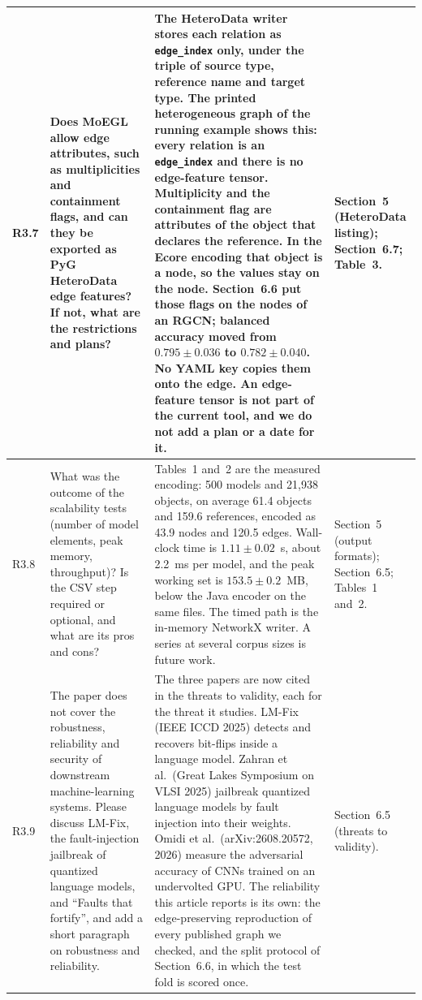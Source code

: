 \documentclass[11pt,a4paper]{article}
\begin{document}
\begin{longtable}{@{}P{1.0cm}P{4.3cm}P{5.9cm}P{3.9cm}@{}}
R3.7 &
Does MoEGL allow edge attributes, such as multiplicities and containment flags, and can they be exported as PyG HeteroData edge features? If not, what are the restrictions and plans? &
The HeteroData writer stores each relation as \texttt{edge\_index} only, under the triple of source type, reference name and target type. The printed heterogeneous graph of the running example shows this: every relation is an \texttt{edge\_index} and there is no edge-feature tensor. Multiplicity and the containment flag are attributes of the object that declares the reference. In the Ecore encoding that object is a node, so the values stay on the node. Section~6.6 put those flags on the nodes of an RGCN; balanced accuracy moved from $0.795\pm0.036$ to $0.782\pm0.040$. No YAML key copies them onto the edge. An edge-feature tensor is not part of the current tool, and we do not add a plan or a date for it. &
Section~5 (HeteroData listing); Section~6.7; Table~3. \\
\midrule

R3.8 &
What was the outcome of the scalability tests (number of model elements, peak memory, throughput)? Is the CSV step required or optional, and what are its pros and cons? &
Tables~1 and~2 are the measured encoding: 500 models and 21{,}938 objects, on average 61.4 objects and 159.6 references, encoded as 43.9 nodes and 120.5 edges. Wall-clock time is $1.11\pm0.02$~s, about 2.2~ms per model, and the peak working set is $153.5\pm0.2$~MB, below the Java encoder on the same files. The timed path is the in-memory NetworkX writer. A series at several corpus sizes is future work. &
Section~5 (output formats); Section~6.5; Tables~1 and~2. \\
\midrule

R3.9 &
The paper does not cover the robustness, reliability and security of downstream machine-learning systems. Please discuss LM-Fix, the fault-injection jailbreak of quantized language models, and ``Faults that fortify'', and add a short paragraph on robustness and reliability. &
The three papers are now cited in the threats to validity, each for the threat it studies. LM-Fix (IEEE ICCD 2025) detects and recovers bit-flips inside a language model. Zahran et al.\ (Great Lakes Symposium on VLSI 2025) jailbreak quantized language models by fault injection into their weights. Omidi et al.\ (arXiv:2608.20572, 2026) measure the adversarial accuracy of CNNs trained on an undervolted GPU. The reliability this article reports is its own: the edge-preserving reproduction of every published graph we checked, and the split protocol of Section~6.6, in which the test fold is scored once. &
Section~6.5 (threats to validity). \\
\midrule


\end{longtable}
\end{document}
